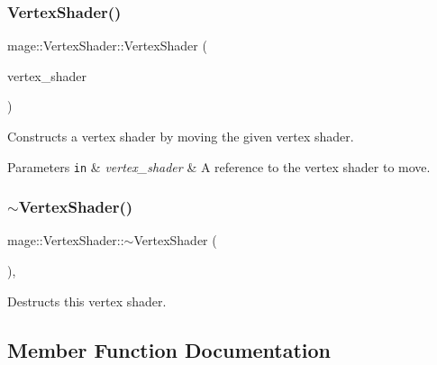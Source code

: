 \subsubsection{\texorpdfstring{Vertex\+Shader()}{VertexShader()}\hspace{0.1cm}{\footnotesize\ttfamily [4/4]}}
{\footnotesize\ttfamily mage\+::\+Vertex\+Shader\+::\+Vertex\+Shader (\begin{DoxyParamCaption}\item[{\hyperlink{classmage_1_1_vertex_shader}{Vertex\+Shader} \&\&}]{vertex\+\_\+shader }\end{DoxyParamCaption})\hspace{0.3cm}{\ttfamily [default]}}

Constructs a vertex shader by moving the given vertex shader.


\begin{DoxyParams}[1]{Parameters}
\mbox{\tt in}  & {\em vertex\+\_\+shader} & A reference to the vertex shader to move. \\
\hline
\end{DoxyParams}
\hypertarget{classmage_1_1_vertex_shader_aa475ad31613dd20fdcc4930409fd0cfd}{}\label{classmage_1_1_vertex_shader_aa475ad31613dd20fdcc4930409fd0cfd} 
\subsubsection{\texorpdfstring{$\sim$\+Vertex\+Shader()}{~VertexShader()}}
{\footnotesize\ttfamily mage\+::\+Vertex\+Shader\+::$\sim$\+Vertex\+Shader (\begin{DoxyParamCaption}{ }\end{DoxyParamCaption})\hspace{0.3cm}{\ttfamily [virtual]}, {\ttfamily [default]}}

Destructs this vertex shader. 

\subsection{Member Function Documentation}
\hypertarget{classmage_1_1_vertex_shader_a0094f5c2adb8377fa5c8d52e7a65136f}{}\label{classmage_1_1_vertex_shader_a0094f5c2adb8377fa5c8d52e7a65136f} 
